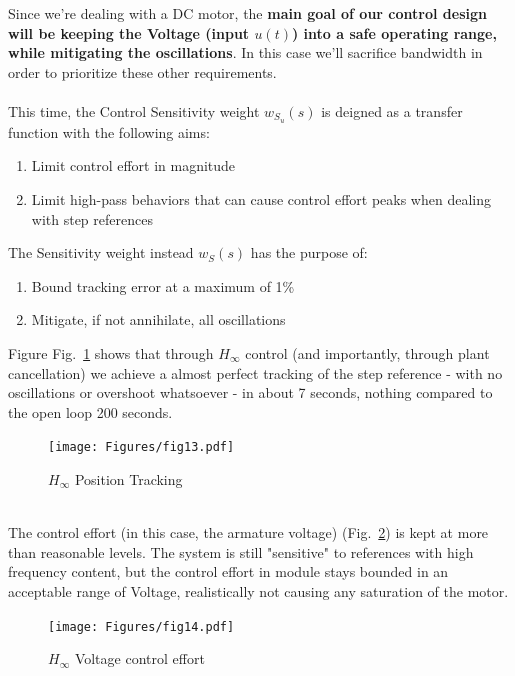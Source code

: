 \documentclass[a4paper, 12pt]{article}
\begin{document}
Since we're dealing with a DC motor, the \textbf{main goal of our control design will be keeping the Voltage (input $u(t)$) into a safe operating range, while mitigating the oscillations}. In this case we'll sacrifice bandwidth in order to prioritize these other requirements.
\\\\
This time, the Control Sensitivity weight $w_{S_u}(s)$ is deigned as a transfer function with the following aims:
\begin{enumerate}
    \item Limit control effort in magnitude
    \item Limit high-pass behaviors that can cause control effort peaks when dealing with step references
\end{enumerate}
The Sensitivity weight instead $w_S(s)$ has the purpose of:
\begin{enumerate}
    \item Bound tracking error at a maximum of 1\%
    \item Mitigate, if not annihilate, all oscillations
\end{enumerate}
Figure Fig.~\ref{fig:fig13} shows that through $H_\infty$ control (and importantly, through plant cancellation) we achieve a almost perfect tracking of the step reference - with no oscillations or overshoot whatsoever - in about 7 seconds, nothing compared to the open loop 200 seconds.
\begin{figure}[h!]
    \centering
    \texttt{[image: Figures/fig13.pdf]}
        \caption{$H_\infty$ Position Tracking}
    \label{fig:fig13}
\end{figure}
\\
The control effort (in this case, the armature voltage) (Fig.~\ref{fig:fig14}) is kept at more than reasonable levels. The system is still "sensitive" to references with high frequency content, but the control effort in module stays bounded in an acceptable range of Voltage, realistically not causing any saturation of the motor.
\begin{figure}[h!]
    \centering
    \texttt{[image: Figures/fig14.pdf]}
        \caption{$H_\infty$ Voltage control effort}
    \label{fig:fig14}
\end{figure}
\\
\end{document}
